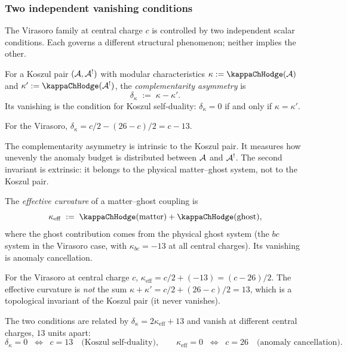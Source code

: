\subsubsection{Two independent vanishing conditions}

The Virasoro family at central charge $c$ is controlled by two
independent scalar conditions. Each governs a different
structural phenomenon; neither implies the other.

\begin{definition}
For a Koszul pair $(\mathcal{A}, \mathcal{A}^!)$ with modular characteristics
$\kappa := \kappaChHodge(\cA)$ and $\kappa' := \kappaChHodge(\cA^!)$, the
\emph{complementarity asymmetry} is
\begin{equation}%
\delta_\kappa \;:=\; \kappa - \kappa'.
\end{equation}
Its vanishing is the condition for Koszul self-duality:
$\delta_\kappa = 0$ if and only if $\kappa = \kappa'$.
\end{definition}

For the Virasoro, $\delta_\kappa = c/2 - (26-c)/2 = c - 13$.

The complementarity asymmetry is intrinsic to the Koszul
pair. It measures how unevenly the anomaly budget is
distributed between $\mathcal{A}$ and $\mathcal{A}^!$. The second
invariant is extrinsic: it belongs to the physical
matter--ghost system, not to the Koszul pair.

\begin{definition}
The \emph{effective curvature} of a matter--ghost coupling is
\[
\kappa_{\mathrm{eff}} \;:=\;
\kappaChHodge(\mathrm{matter}) + \kappaChHodge(\mathrm{ghost}),
\]
where the ghost contribution comes from the physical ghost
system (the $bc$ system in the Virasoro case, with
$\kappa_{bc} = -13$ at all central charges). Its vanishing
is anomaly cancellation.
\end{definition}

For the Virasoro at central charge $c$,
$\kappa_{\mathrm{eff}} = c/2 + (-13) = (c-26)/2$. The
effective curvature is \emph{not} the sum
$\kappa + \kappa' = c/2 + (26-c)/2 = 13$, which is a
topological invariant of the Koszul pair (it never vanishes).

The two conditions are related by
$\delta_\kappa = 2\kappa_{\mathrm{eff}} + 13$ and vanish
at different central charges, $13$ units apart:
\[
\delta_\kappa = 0
\;\;\Longleftrightarrow\;\;
c = 13
\quad\text{(Koszul self-duality)},
\qquad
\kappa_{\mathrm{eff}} = 0
\;\;\Longleftrightarrow\;\;
c = 26
\quad\text{(anomaly cancellation)}.
\]

